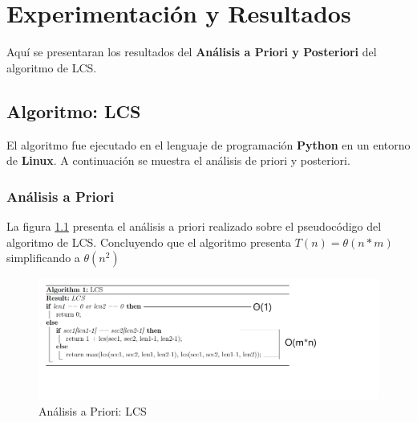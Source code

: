 \chapter{Experimentación y Resultados}
    Aquí se presentaran los resultados del \textbf{Análisis a Priori y Posteriori} del algoritmo de LCS.
    
\section{Algoritmo: LCS}
El algoritmo fue ejecutado en el lenguaje de programación \textbf{Python} en un entorno de \textbf{Linux}. A continuación se muestra el análisis de priori y posteriori. 
    \subsection{Análisis a Priori}
        La figura \ref{fig:priori} presenta el análisis a priori realizado sobre el pseudocódigo del algoritmo de LCS. Concluyendo que el algoritmo presenta \(T(n) = \theta(n*m)\) simplificando a \(\theta(n^{2})\)
        
        \begin{figure}[htp!]
            \centering
            \includegraphics[width=1 \textwidth]{Images/A_Priori/priori.png}
            \caption{Análisis a Priori: LCS}
            \label{fig:priori}
        \end{figure}
    
    \newpage    
